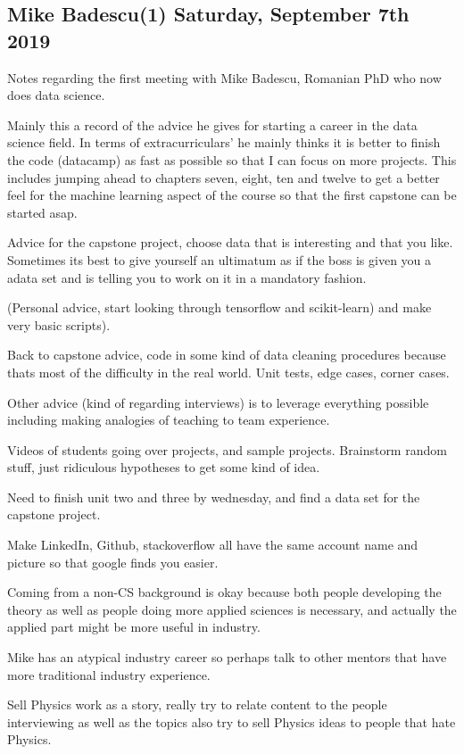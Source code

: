 \subsection{Mike Badescu(1) Saturday, September 7th 2019}

Notes regarding the first meeting with Mike Badescu,
Romanian PhD who now does data science.

Mainly this a record of the advice he gives for starting a career
in the data science field. In terms of extracurriculars'
he mainly thinks it is better to finish the code (datacamp)
as fast as possible so that I can focus on more projects. 
This includes jumping ahead to chapters seven, eight, 
ten and twelve to get a better
feel for the machine learning aspect of the course so that
the first capstone can be started asap.

Advice for the capstone project, choose data that
is interesting and that you like. Sometimes its
best to give yourself an ultimatum 
as if the boss is given you a adata set and is telling you to work
on it in a mandatory fashion. 

(Personal advice, start looking through tensorflow and 
scikit-learn) and make very basic scripts).

Back to capstone advice, code in some kind
of data cleaning
procedures because thats most of the difficulty
in the real world. Unit tests, edge cases, corner
cases. 



Other advice (kind of regarding interviews) is
to leverage everything possible including making
analogies of teaching to team experience. 


Videos of students going over projects, and
sample projects. Brainstorm random stuff,
just ridiculous hypotheses to get some kind
of idea. 

Need to finish unit two and three by wednesday,
and find a data set for the capstone project.

Make LinkedIn, Github, stackoverflow all
have the same account name and picture so
that google finds you easier.

Coming from a non-CS background is okay
because both people developing the theory 
as well as people doing more applied sciences
is necessary, and actually the applied part might
be more useful in industry.

Mike has an atypical industry career so
perhaps talk to other mentors that have
more traditional industry experience.

Sell Physics work as a story, really
try to relate content to the people
interviewing as well as the topics
also try to sell Physics ideas to people that hate Physics. 

